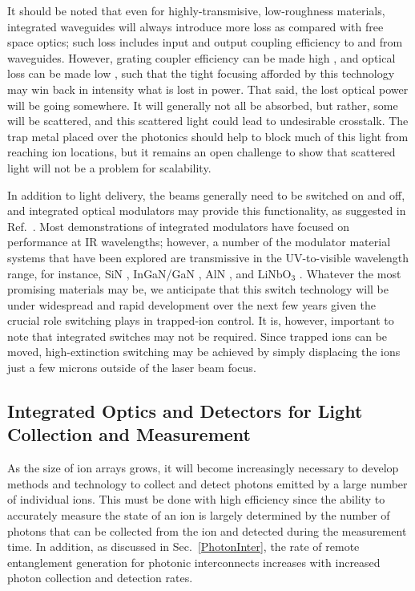 \documentclass[%
reprint,
 amsmath,amssymb,
]{revtex4-1}
\begin{document}
It should be noted that even for highly-transmisive, low-roughness materials, integrated waveguides will always introduce more loss as compared with free space optics; such loss includes input and output coupling efficiency to and from waveguides.  However, grating coupler efficiency can be made high \cite{NotarosHighEffGratings2016, MehtaGrating2017}, and optical loss can be made low \cite{WestAl2O32018}, such that the tight focusing afforded by this technology may win back in intensity what is lost in power.  That said, the lost optical power will be going somewhere.  It will generally not all be absorbed, but rather, some will be scattered, and this scattered light could lead to undesirable crosstalk.  The trap metal placed over the photonics should help to block much of this light from reaching ion locations, but it remains an open challenge to show that scattered light will not be a problem for scalability.

In addition to light delivery, the beams generally need to be switched on and off, and integrated optical modulators may provide this functionality, as suggested in Ref.~\cite{KielpinskiIntPhotonArch2016}.  Most demonstrations of integrated modulators have focused on performance at IR wavelengths; however, a number of the modulator material systems that have been explored are transmissive in the UV-to-visible wavelength range, for instance, SiN \cite{YegnanarayananSiNModulators2018, MohantyBlueSiNModulators2018}, InGaN/GaN \cite{FengGaNmodulator2018}, AlN \cite{XiongAlN2012, ZhuAlNMod2016}, and LiNbO$_3$ \cite{MehtaLiNbO3VisMod2017, WangLoncarModulators2018, DesiatovVisLiNbO3Mod2019}.  Whatever the most promising materials may be, we anticipate that this switch technology will be under widespread and rapid development over the next few years given the crucial role switching plays in trapped-ion control.  It is, however, important to note that integrated switches may not be required.  Since trapped ions can be moved, high-extinction switching may be achieved by simply displacing the ions just a few microns outside of the laser beam focus.


\subsection{Integrated Optics and Detectors for Light Collection and Measurement}
As the size of ion arrays grows, it will become increasingly necessary to develop methods and technology to collect and detect photons emitted by a large number of individual ions.  This must be done with high efficiency since the ability to accurately measure the state of an ion is largely determined by the number of photons that can be collected from the ion and detected during the measurement time.  In addition, as discussed in Sec.~\ref{PhotonInter}, the rate of remote entanglement generation for photonic interconnects increases with increased photon collection and detection rates.
\end{document}
